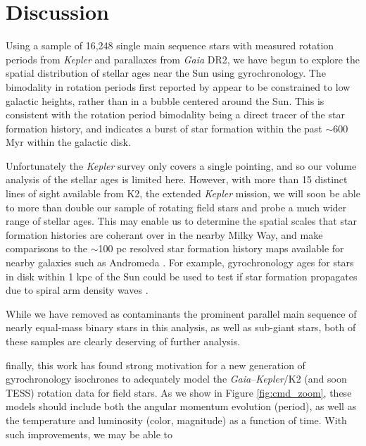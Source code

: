 \documentclass[preprint2]{aastex62}
\newcommand{\Kepler}{\textsl{Kepler}\xspace}
\begin{document}
\section{Discussion}

Using a sample of 16,248 single main sequence stars with measured rotation periods from \Kepler and parallaxes from {\em Gaia} DR2, we have begun to explore the spatial distribution of stellar ages near the Sun using gyrochronology. The bimodality in rotation periods first reported by \citet{mcquillan2013} appear to be constrained to low galactic heights, rather than in a bubble centered around the Sun. This is consistent with the rotation period bimodality being a direct tracer of the star formation history, and indicates a burst of star formation within the past $\sim$600 Myr within the galactic disk.


Unfortunately the \Kepler survey only covers a single pointing, and so our volume analysis of the stellar ages is limited here. However, with more than 15 distinct lines of sight available from K2, the extended \Kepler mission, we will soon be able to more than double our sample of rotating field stars and probe a much wider range of stellar ages. This may enable us to determine the spatial scales that star formation histories are coherant over in the nearby Milky Way, and make comparisons to the $\sim$100 pc resolved star formation history maps available for nearby galaxies such as Andromeda \citep[][]{lewis2015,williams2017}. For example, gyrochronology ages for stars in disk within 1 kpc of the Sun could be used to test if star formation propagates due to spiral arm density waves \citep[e.g. see][]{choi2015}.


While we have removed as contaminants the prominent parallel main sequence of nearly equal-mass binary stars in this analysis, as well as sub-giant stars, both of these samples are clearly deserving of further analysis. %

finally, this work has found strong motivation for a new generation of gyrochronology isochrones to adequately model the {\em Gaia}--\Kepler/K2 (and soon TESS) rotation data for field stars. As we show in Figure \ref{fig:cmd_zoom}, these models should include both the angular momentum evolution (period), as well as the temperature and luminosity (color, magnitude) as a function of time. With such improvements, we may be able to 



\acknowledgments
\end{document}
